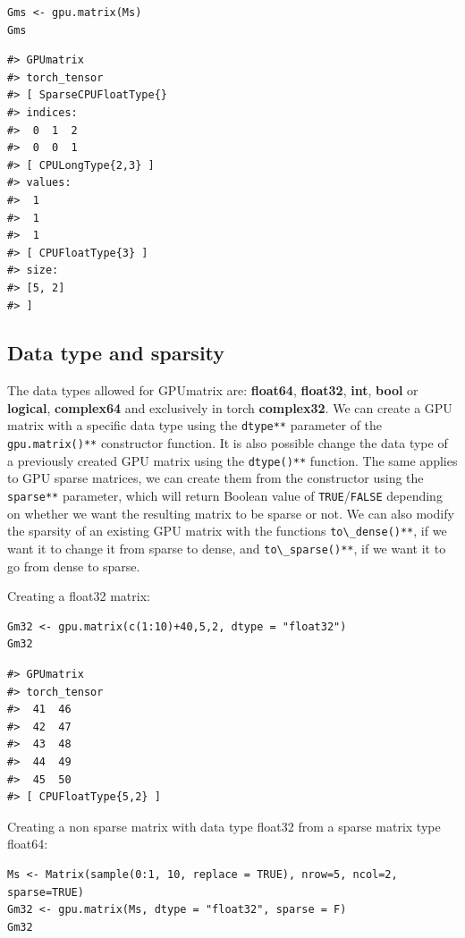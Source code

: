 \begin{verbatim}
Gms <- gpu.matrix(Ms)
Gms
\end{verbatim}

\begin{verbatim}
#> GPUmatrix
#> torch_tensor
#> [ SparseCPUFloatType{}
#> indices:
#>  0  1  2
#>  0  0  1
#> [ CPULongType{2,3} ]
#> values:
#>  1
#>  1
#>  1
#> [ CPUFloatType{3} ]
#> size:
#> [5, 2]
#> ]
\end{verbatim}

\hypertarget{data-type-and-sparsity}{%
\subsection{Data type and sparsity}\label{data-type-and-sparsity}}

The data types allowed for GPUmatrix are: \textbf{float64}, \textbf{float32}, \textbf{int}, \textbf{bool} or \textbf{logical}, \textbf{complex64} and exclusively in torch \textbf{complex32}. We can create a GPU matrix with a specific data type using the \texttt{dtype**} parameter of the \texttt{gpu.matrix()**} constructor function. It is also possible change the data type of a previously created GPU matrix using the \texttt{dtype()**} function. The same applies to GPU sparse matrices, we can create them from the constructor using the \texttt{sparse**} parameter, which will return Boolean value of \texttt{TRUE}/\texttt{FALSE} depending on whether we want the resulting matrix to be sparse or not. We can also modify the sparsity of an existing GPU matrix with the functions \texttt{to\textbackslash{}\_dense()**}, if we want it to change it from sparse to dense, and \texttt{to\textbackslash{}\_sparse()**}, if we want it to go from dense to sparse.

Creating a float32 matrix:

\begin{verbatim}
Gm32 <- gpu.matrix(c(1:10)+40,5,2, dtype = "float32")
Gm32
\end{verbatim}

\begin{verbatim}
#> GPUmatrix
#> torch_tensor
#>  41  46
#>  42  47
#>  43  48
#>  44  49
#>  45  50
#> [ CPUFloatType{5,2} ]
\end{verbatim}

Creating a non sparse matrix with data type float32 from a sparse matrix type float64:

\begin{verbatim}
Ms <- Matrix(sample(0:1, 10, replace = TRUE), nrow=5, ncol=2, sparse=TRUE)
Gm32 <- gpu.matrix(Ms, dtype = "float32", sparse = F)
Gm32
\end{verbatim}

